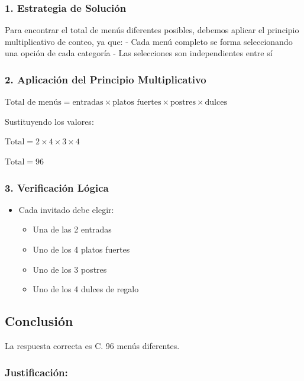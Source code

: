 \documentclass[
]{article}
\providecommand{\tightlist}{%
  \setlength{\itemsep}{0pt}\setlength{\parskip}{0pt}}
\begin{document}
\subsubsection{1. Estrategia de
Solución}\label{estrategia-de-soluciuxf3n}

Para encontrar el total de menús diferentes posibles, debemos aplicar el
principio multiplicativo de conteo, ya que: - Cada menú completo se
forma seleccionando una opción de cada categoría - Las selecciones son
independientes entre sí

\subsubsection{2. Aplicación del Principio
Multiplicativo}\label{aplicaciuxf3n-del-principio-multiplicativo}

\(\text{Total de menús} = \text{entradas} \times \text{platos fuertes} \times \text{postres} \times \text{dulces}\)

Sustituyendo los valores:

\(\text{Total} = 2 \times 4 \times 3 \times 4\)

\(\text{Total} = 96\)

\subsubsection{3. Verificación Lógica}\label{verificaciuxf3n-luxf3gica}

\begin{itemize}
\tightlist
\item
  Cada invitado debe elegir:

  \begin{itemize}
  \tightlist
  \item
    Una de las 2 entradas
  \item
    Uno de los 4 platos fuertes
  \item
    Uno de los 3 postres
  \item
    Uno de los 4 dulces de regalo
  \end{itemize}
\end{itemize}

\subsection{Conclusión}\label{conclusiuxf3n-11}

La respuesta correcta es C. 96 menús diferentes.

\subsubsection{Justificación:}\label{justificaciuxf3n-7}
\end{document}
